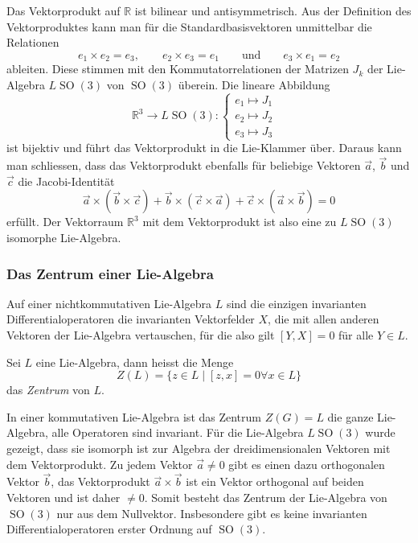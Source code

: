 \begin{beispiel}
Das Vektorprodukt auf $\mathbb{R}$ ist bilinear und antisymmetrisch.
Aus der Definition des Vektorproduktes kann man für die Standardbasisvektoren
unmittelbar die Relationen
\[
e_1\times e_2
=
e_3,
\qquad
e_2\times e_3
=
e_1
\qquad\text{und}\qquad
e_3\times e_1
=
e_2
\]
ableiten.
Diese stimmen mit den Kommutatorrelationen der Matrizen $J_k$ der
Lie-Algebra $L\operatorname{SO}(3)$ von $\operatorname{SO}(3)$ überein.
Die lineare Abbildung
\[
\mathbb{R}^3 \to L\operatorname{SO}(3):
\begin{cases}
e_1 \mapsto J_1&\\
e_2 \mapsto J_2&\\
e_3 \mapsto J_3&
\end{cases}
\]
ist bijektiv und
führt das Vektorprodukt in die Lie-Klammer über.
Daraus kann man schliessen, dass das Vektorprodukt ebenfalls für beliebige
Vektoren $\vec{a}$, $\vec{b}$ und $\vec{c}$ die Jacobi-Identität
\[
\vec{a}\times (\vec{b}\times\vec{c})
+
\vec{b}\times (\vec{c}\times\vec{a})
+
\vec{c}\times (\vec{a}\times\vec{b})
=
0
\]
erfüllt.
Der Vektorraum $\mathbb{R}^3$ mit dem Vektorprodukt ist also eine
zu $L\operatorname{SO}(3)$ isomorphe Lie-Algebra.
\end{beispiel}

%
%
\subsubsection{Das Zentrum einer Lie-Algebra}
Auf einer nichtkommutativen Lie-Algebra $L$ sind die einzigen invarianten
Differentialoperatoren die invarianten Vektorfelder $X$, die mit allen
anderen Vektoren der Lie-Algebra vertauschen, für die also gilt
$[Y,X]=0$ für alle $Y\in L$.

\begin{definition}
Sei $L$ eine Lie-Algebra, dann heisst die Menge
\[
Z(L)
=
\{z\in L\mid [z,x]=0\forall x\in L\}
\]
das {\em Zentrum} von $L$.
\end{definition}

In einer kommutativen Lie-Algebra ist das Zentrum $Z(G)=L$ die ganze
Lie-Algebra, alle Operatoren sind invariant.
Für die Lie-Algebra $L\operatorname{SO}(3)$ wurde gezeigt, dass sie
isomorph ist zur Algebra der dreidimensionalen Vektoren mit dem
Vektorprodukt.
Zu jedem Vektor $\vec{a}\ne 0$ gibt es einen dazu orthogonalen Vektor
$\vec{b}$, das Vektorprodukt $\vec{a}\times\vec{b}$ ist ein Vektor
orthogonal auf beiden Vektoren und ist daher $\ne 0$.
Somit besteht das Zentrum der Lie-Algebra von $\operatorname{SO}(3)$ nur
aus dem Nullvektor.
Insbesondere gibt es keine invarianten Differentialoperatoren erster
Ordnung auf $\operatorname{SO}(3)$.

